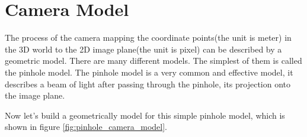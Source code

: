 \chapter{Camera Model}
\label{chap:Camera Model}

The process of the camera mapping the coordinate points(the unit is meter) in the 3D world to the 2D image plane(the unit is pixel) can be described by a geometric model. There are many different models. The simplest of them is called the pinhole model. The pinhole model is a very common and effective model, it describes a beam of light after passing through the pinhole, its projection onto the image plane.

Now let's build a geometrically model for this simple pinhole model, which is shown in figure \ref{fig:pinhole_camera_model}. 


